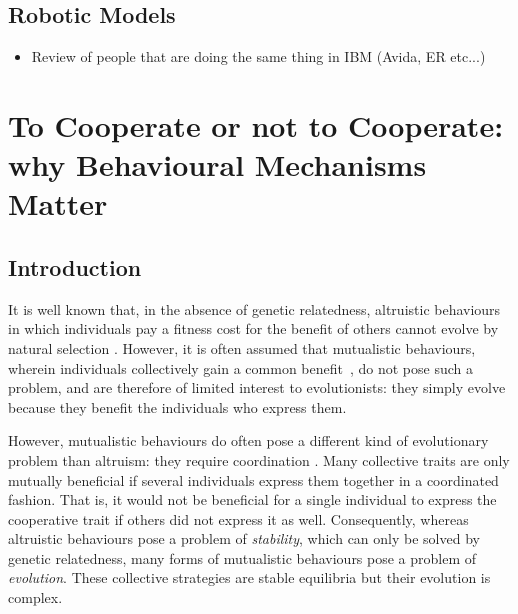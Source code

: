   \subsection{Robotic Models}
    \begin{itemize}
      \item{Review of people that are doing the same thing in IBM (Avida, ER etc...)}
    \end{itemize}

\section{To Cooperate or not to Cooperate: why Behavioural Mechanisms Matter}
  \subsection{Introduction}
    It is well known that, in the absence of genetic relatedness, altruistic behaviours in which individuals pay a fitness cost for the benefit of others cannot evolve by natural selection \cite{Hamilton1964,West2007a}. However, it is often assumed that mutualistic behaviours, wherein individuals collectively gain a common benefit~\cite{Leimar2003, Leimar2010}, do not pose such a problem, and are therefore of limited interest to evolutionists: they simply evolve because they benefit the individuals who express them.

    However, mutualistic behaviours do often pose a different kind of evolutionary problem than altruism: they require coordination \cite{Alvard2001, Alvard2003, Drea2009, Leimar2003}. Many collective traits are only mutually beneficial if several individuals express them together in a coordinated fashion. That is, it would not be beneficial for a single individual to express the cooperative trait if others did not express it as well. Consequently, whereas altruistic behaviours pose a problem of \textit{stability}, which can only be solved by genetic relatedness, many forms of mutualistic behaviours pose a problem of \textit{evolution}. These collective strategies are stable equilibria but their evolution is complex. 

